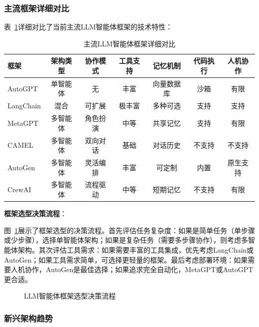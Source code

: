 \subsubsection{主流框架详细对比}

表~\ref{tab:framework-detailed-comparison}详细对比了当前主流LLM智能体框架的技术特性：

\begin{table}[htbp]
    \centering
    \caption{主流LLM智能体框架详细对比}
    \label{tab:framework-detailed-comparison}
    \begin{tabular}{@{}lcccccc@{}}
        \toprule
        \textbf{框架} & \textbf{架构类型} & \textbf{协作模式} & \textbf{工具支持} & \textbf{记忆机制} & \textbf{代码执行} & \textbf{人机协作} \\
        \midrule
        AutoGPT & 单智能体 & 无 & 丰富 & 向量数据库 & 沙箱 & 有限 \\
        LangChain & 混合 & 可扩展 & 极丰富 & 多种可选 & 支持 & 支持 \\
        MetaGPT & 多智能体 & 角色扮演 & 中等 & 共享记忆 & 支持 & 有限 \\
        CAMEL & 多智能体 & 双向对话 & 基础 & 对话历史 & 不支持 & 不支持 \\
        AutoGen & 多智能体 & 灵活编排 & 丰富 & 可定制 & 内置 & 原生支持 \\
        CrewAI & 多智能体 & 流程驱动 & 中等 & 短期记忆 & 不支持 & 有限 \\
        \bottomrule
    \end{tabular}
\end{table}

\textbf{框架选型决策流程}：

图~\ref{fig:framework-selection}展示了框架选型的决策流程。首先评估任务复杂度：如果是简单任务（单步骤或少步骤），选择单智能体架构；如果是复杂任务（需要多步骤协作），则考虑多智能体架构。其次评估工具需求：如果需要丰富的工具集成，优先考虑LangChain或AutoGen；如果工具需求简单，可选择更轻量的框架。最后考虑部署环境：如果需要人机协作，AutoGen是最佳选择；如果追求完全自动化，MetaGPT或AutoGPT更合适。

\begin{figure}[htbp]
    \centering
    
    \caption{LLM智能体框架选型决策流程}
    \label{fig:framework-selection}
\end{figure}

\subsubsection{新兴架构趋势}

